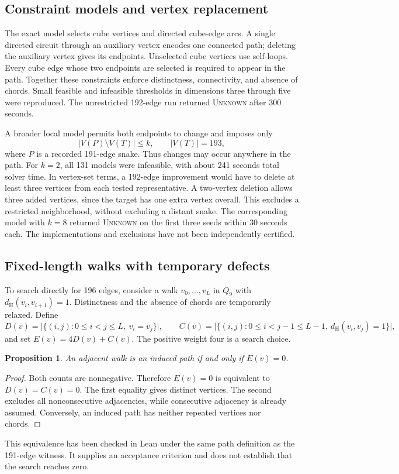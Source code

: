 \documentclass[11pt,a4paper]{article}
\newtheorem{proposition}[theorem]{Proposition}
\theoremstyle{definition}
\theoremstyle{remark}
\newcommand{\Q}{Q}
\newcommand{\Ham}{d_{\mathrm H}}
\begin{document}
\subsection{Constraint models and vertex replacement}
The exact model selects cube vertices and directed cube-edge arcs. A single directed circuit through an auxiliary vertex encodes one connected path; deleting the auxiliary vertex gives its endpoints. Unselected cube vertices use self-loops. Every cube edge whose two endpoints are selected is required to appear in the path. Together these constraints enforce distinctness, connectivity, and absence of chords. Small feasible and infeasible thresholds in dimensions three through five were reproduced. The unrestricted 192-edge run returned \textsc{Unknown} after 300 seconds.

A broader local model permits both endpoints to change and imposes only
\[
|V(P)\setminus V(T)|\le k,\qquad |V(T)|=193,
\]
where $P$ is a recorded 191-edge snake. Thus changes may occur anywhere in the path. For $k=2$, all 131 models were infeasible, with about 241 seconds total solver time. In vertex-set terms, a 192-edge improvement would have to delete at least three vertices from each tested representative. A two-vertex deletion allows three added vertices, since the target has one extra vertex overall. This excludes a restricted neighborhood, without excluding a distant snake. The corresponding model with $k=8$ returned \textsc{Unknown} on the first three seeds within 30 seconds each. The implementations and exclusions have not been independently certified.

\subsection{Fixed-length walks with temporary defects}
To search directly for 196 edges, consider a walk $v_0,\ldots,v_L$ in $\Q_9$ with $\Ham(v_i,v_{i+1})=1$. Distinctness and the absence of chords are temporarily relaxed. Define
\[
D(v)=\bigl|\{(i,j):0\le i<j\le L,\ v_i=v_j\}\bigr|,
\qquad
C(v)=\bigl|\{(i,j):0\le i<j-1\le L-1,\ \Ham(v_i,v_j)=1\}\bigr|,
\]
and set $E(v)=4D(v)+C(v)$. The positive weight four is a search choice.

\begin{proposition}\label{prop:zero-defect}
An adjacent walk is an induced path if and only if $E(v)=0$.
\end{proposition}
\begin{proof}
Both counts are nonnegative. Therefore $E(v)=0$ is equivalent to $D(v)=C(v)=0$. The first equality gives distinct vertices. The second excludes all nonconsecutive adjacencies, while consecutive adjacency is already assumed. Conversely, an induced path has neither repeated vertices nor chords.
\end{proof}
This equivalence has been checked in Lean under the same path definition as the 191-edge witness. It supplies an acceptance criterion and does not establish that the search reaches zero.
\end{document}
